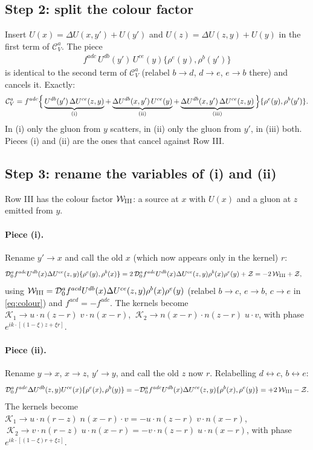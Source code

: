 \documentclass[10pt]{article}
\numberwithin{equation}{section}
\begin{document}
\subsection{Step 2: split the colour factor}
Insert $U(x)=\Delta U(x,y')+U(y')$ and $U(z)=\Delta U(z,y)+U(y)$ in the first term of $\mathcal{C}_{V}^{a}$. The piece
\begin{align}
f^{adc}\,U^{db}(y')\,U^{ce}(y)\{\rho^{e}(y),\rho^{b}(y')\}
\end{align}
is identical to the second term of $\mathcal{C}_{V}^{a}$ (relabel $b\to d$, $d\to e$, $e\to b$ there) and cancels it. Exactly:
\begin{align}
\mathcal{C}_{V}^{a}=f^{adc}\Big\{\underbrace{U^{db}(y')\,\Delta U^{ce}(z,y)}_{\rm (i)}+\underbrace{\Delta U^{db}(x,y')\,U^{ce}(y)}_{\rm (ii)}+\underbrace{\Delta U^{db}(x,y')\,\Delta U^{ce}(z,y)}_{\rm (iii)}\Big\}\{\rho^{e}(y),\rho^{b}(y')\}. \label{eq:CVsplit}
\end{align}
In (i) only the gluon from $y$ scatters, in (ii) only the gluon from $y'$, in (iii) both. Pieces (i) and (ii) are the ones that cancel against Row III.

\subsection{Step 3: rename the variables of (i) and (ii)}
Row III has the colour factor $\mathcal{W}_{\rm III}$: a source at $x$ with $U(x)$ and a gluon at $z$ emitted from $y$.
\paragraph{Piece (i).} Rename $y'\to x$ and call the old $x$ (which now appears only in the kernel) $r$:
\begin{align}
\mathcal{D}_{0}^{a}f^{adc}U^{db}(x)\Delta U^{ce}(z,y)\{\rho^{e}(y),\rho^{b}(x)\}
&=2\,\mathcal{D}_{0}^{a}f^{adc}U^{db}(x)\Delta U^{ce}(z,y)\rho^{b}(x)\rho^{e}(y)+\mathcal{Z}=-2\,\mathcal{W}_{\rm III}+\mathcal{Z},
\end{align}
using $\mathcal{W}_{\rm III}=\mathcal{D}_{0}^{a}f^{acd}U^{db}(x)\Delta U^{ce}(z,y)\rho^{b}(x)\rho^{e}(y)$ (relabel $b\to c$, $e\to b$, $c\to e$ in \eqref{eq:colour}) and $f^{acd}=-f^{adc}$. The kernels become
$\mathcal{K}_{1}\to u\cdot n(z-r)\;v\cdot n(x-r)$, $\ \mathcal{K}_{2}\to n(x-r)\cdot n(z-r)\;u\cdot v$, with phase $e^{ik\cdot[(1-\xi)z+\xi r]}$.
\paragraph{Piece (ii).} Rename $y\to x$, $x\to z$, $y'\to y$, and call the old $z$ now $r$. Relabelling $d\leftrightarrow c$, $b\leftrightarrow e$:
\begin{align}
\mathcal{D}_{0}^{a}f^{adc}\Delta U^{db}(z,y)U^{ce}(x)\{\rho^{e}(x),\rho^{b}(y)\}=-\mathcal{D}_{0}^{a}f^{adc}U^{db}(x)\Delta U^{ce}(z,y)\{\rho^{b}(x),\rho^{e}(y)\}=+2\,\mathcal{W}_{\rm III}-\mathcal{Z}.
\end{align}
The kernels become $\mathcal{K}_{1}\to u\cdot n(r-z)\;n(x-r)\cdot v=-u\cdot n(z-r)\;v\cdot n(x-r)$, $\ \mathcal{K}_{2}\to v\cdot n(r-z)\;u\cdot n(x-r)=-v\cdot n(z-r)\;u\cdot n(x-r)$, with phase $e^{ik\cdot[(1-\xi)r+\xi z]}$.
\end{document}
